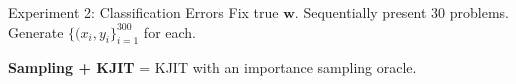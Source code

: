 \documentclass[english]{beamer}
\begin{document}
\begin{frame}
\begin{columns}[t]
\begin{block}{ Experiment 2: Classification Errors}
    Fix true $\boldsymbol{w}$. Sequentially present 30 problems. Generate
    $\{(x_i, y_i\}_{i=1}^{300}$ for each.  
\begin{figure}[ht]
    \vspace{5mm}
  \centering
  \hspace{5mm}
  \label{fig:logistic_performance}
\end{figure}

\textbf{Sampling + KJIT} = KJIT with an importance sampling oracle.


\end{block}
\end{columns}
\end{frame}
\end{document}
